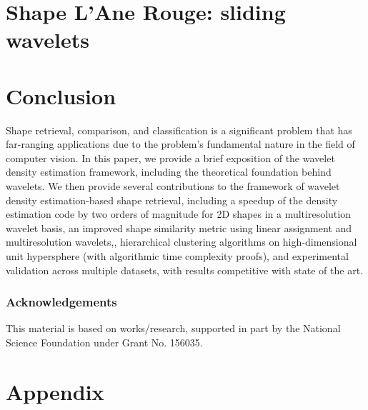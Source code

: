 \documentclass{article}
\begin{document}
\part{Shape L'Ane Rouge: sliding wavelets}
  
  
  

\part{Conclusion}
  Shape retrieval, comparison, and classification is a significant problem that has far-ranging applications due to the problem's fundamental nature in the field of computer vision. In this paper, we provide a brief exposition of the wavelet density estimation framework, including the theoretical foundation behind wavelets. We then provide several contributions to the framework of wavelet density estimation-based shape retrieval, including a speedup of the density estimation code by two orders of magnitude for 2D shapes in a multiresolution wavelet basis, an improved shape similarity metric using linear assignment and multiresolution wavelets,, hierarchical clustering algorithms on high-dimensional unit hypersphere (with algorithmic time complexity proofs), and experimental validation across multiple datasets, with results competitive with state of the art.

  \section{Acknowledgements}
    This material is based on works/research, supported in part by the National Science Foundation under Grant No. 156035.

\newpage



\part{Appendix}
  
\end{document}
